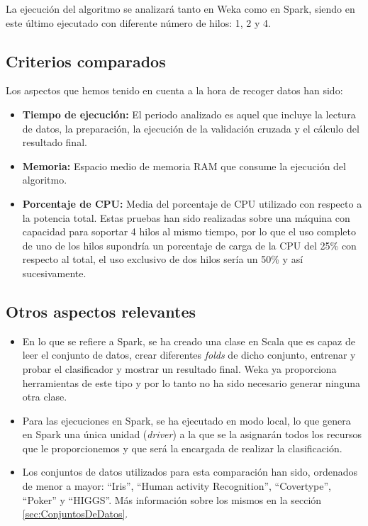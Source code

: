 La ejecución del algoritmo se analizará tanto en Weka como en Spark, siendo en este último ejecutado con diferente número de hilos: 1, 2 y 4.

\subsection{Criterios comparados}

Los aspectos que hemos tenido en cuenta a la hora de recoger datos han sido:

\begin{itemize}
	\item \textbf{Tiempo de ejecución:} El periodo analizado es aquel que incluye la lectura de datos, la preparación, la ejecución de la validación cruzada y el cálculo del resultado final.
	\item \textbf{Memoria:} Espacio medio de memoria RAM que consume la ejecución del algoritmo.
	\item \textbf{Porcentaje de CPU:} Media del porcentaje de CPU utilizado con respecto a la potencia total. Estas pruebas han sido realizadas sobre una máquina con capacidad para soportar 4 hilos al mismo tiempo, por lo que el uso completo de uno de los hilos supondría un porcentaje de carga de la CPU del 25\% con respecto al total, el uso exclusivo de dos hilos sería un 50\% y así sucesivamente.

\end{itemize}

\subsection{Otros aspectos relevantes}

\begin{itemize}
	\item En lo que se refiere a Spark, se ha creado una clase en Scala que es capaz de leer el conjunto de datos, crear diferentes \textit{folds} de dicho conjunto, entrenar y probar el clasificador y mostrar un resultado final. Weka ya proporciona herramientas de este tipo y por lo tanto no ha sido necesario generar ninguna otra clase.
	\item Para las ejecuciones en Spark, se ha ejecutado en modo local, lo que genera en Spark una única unidad (\textit{driver}) a la que se la asignarán todos los recursos que le proporcionemos y que será la encargada de realizar la clasificación.
	\item Los conjuntos de datos utilizados para esta comparación han sido, ordenados de menor a mayor: ``Iris'',  ``Human activity Recognition'', ``Covertype'', ``Poker'' y ``HIGGS''. Más información sobre los mismos en la sección \ref{sec:ConjuntosDeDatos}.
\end{itemize}

